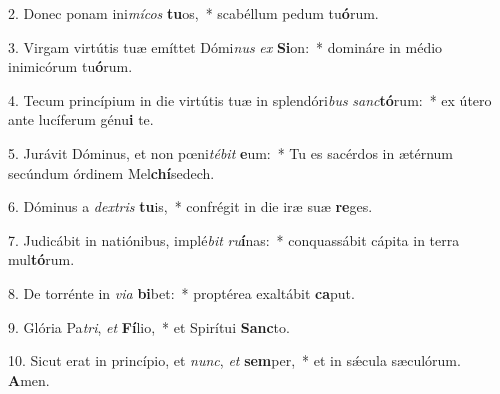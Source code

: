 2. Donec ponam ini\textit{mí}\textit{cos} \textbf{tu}os,~*  scabéllum pedum tu\textbf{ó}rum.\

3. Virgam virtútis tuæ emíttet Dómi\textit{nus} \textit{ex} \textbf{Si}on:~*  domináre in médio inimicórum tu\textbf{ó}rum.\

4. Tecum princípium in die virtútis tuæ in splendóri\textit{bus} \textit{sanc}\textbf{tó}rum:~*  ex útero ante lucíferum génu\textbf{i} te.\

5. Jurávit Dóminus, et non pœni\textit{té}\textit{bit} \textbf{e}um:~*  Tu es sacérdos in ætérnum secúndum órdinem Mel\textbf{chí}sedech.\

6. Dóminus a \textit{dex}\textit{tris} \textbf{tu}is,~*  confrégit in die iræ suæ \textbf{re}ges.\

7. Judicábit in natiónibus, implé\textit{bit} \textit{ru}\textbf{í}nas:~*  conquassábit cápita in terra mul\textbf{tó}rum.\

8. De torrénte in \textit{vi}\textit{a} \textbf{bi}bet:~*  proptérea exaltábit \textbf{ca}put.\

9. Glória Pa\textit{tri}, \textit{et} \textbf{Fí}lio,~*  et Spirítui \textbf{Sanc}to.\

10. Sicut erat in princípio, et \textit{nunc}, \textit{et} \textbf{sem}per,~*  et in sǽcula sæculórum. \textbf{A}men.\

